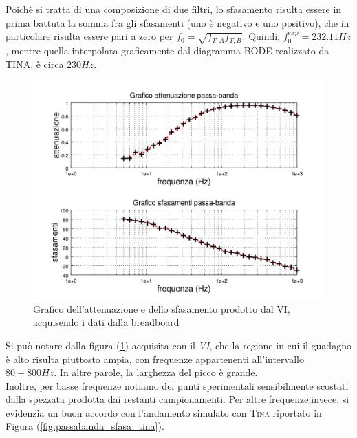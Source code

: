 \documentclass[journal, a4paper]{IEEEtran}
\begin{document}
Poichè si tratta di una composizione di due filtri, lo sfasamento risulta essere in prima battuta la somma fra gli sfasamenti (uno è negativo e uno positivo), che in particolare risulta essere pari a zero per $f_0 = \sqrt{f_{T,A}f_{T,B}} $. Quindi, $f_0^{exp} = 232.11 \si{Hz}$, mentre quella interpolata graficamente dal diagramma \textsc{BODE} realizzato da \textsc{TINA}, è circa $230 \si{Hz}$. 

\begin{figure}
\centering
\includegraphics[width=1.1\linewidth]{./passabanda_sfasa_octave}
\caption{Grafico dell'attenuazione e dello sfasamento prodotto dal VI, acquisendo i dati dalla breadboard}
\label{fig:passabanda_sfasa_octave}
\end{figure}


Si può notare dalla figura (\ref{fig:passabanda_sfasa_octave}) acquisita con il \textit{VI}, che la regione in cui il guadagno è alto risulta piuttosto ampia, con frequenze appartenenti all'intervallo $80-800 \si{Hz}$. In altre parole, la larghezza del picco è grande. \\
Inoltre, per basse frequenze notiamo dei punti sperimentali sensibilmente scostati dalla spezzata prodotta dai restanti campionamenti. Per altre frequenze,invece, si evidenzia un buon accordo con l'andamento simulato con \textsc{Tina} riportato in Figura (\ref{fig:passabanda_sfasa_tina}). 
\end{document}
